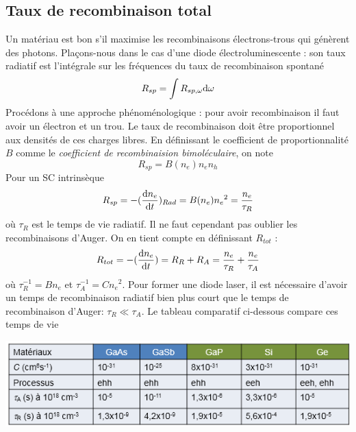 	\subsection{Taux de recombinaison total}
	Un matériau est bon s'il maximise les recombinaisons électrons-trous qui génèrent des photons. 
	Plaçons-nous dans le cas d'une diode électroluminescente : son taux radiatif est l'intégrale 
	sur les fréquences du taux de recombinaison spontané
	\begin{equation}
	{R_{sp}} = \int {{R_{sp,\omega }}{\rm{d}}\omega } 
	\end{equation}
	Procédons à une approche phénoménologique : pour avoir recombinaison il faut avoir un électron 
	et un trou. Le taux de recombinaison doit être proportionnel aux densités de ces charges libres. 
	En définissant le coefficient de proportionnalité $B$ comme le \textit{coefficient de 
	recombinaision bimoléculaire}, on note
	\begin{equation}
	{R_{sp}} = B({n_e}){n_e}{n_h}
	\end{equation}
	Pour un SC intrinsèque
	\begin{equation}
	{R_{sp}} =  - {(\frac{{{\rm{d}}{n_e}}}{{{\rm{d}}t}})_{Rad}} = B({n_e}){n_e}^2 = \frac{{{n_e}}}
	{{{\tau _R}}}
	\end{equation}
	où $\tau_R$ est le temps de vie radiatif. Il ne faut cependant pas oublier les recombinaisons 
	d'Auger. On en tient compte en définissant $R_{tot}$ :
	\begin{equation}
	{R_{tot}} =  - (\frac{{{\rm{d}}{n_e}}}{{{\rm{d}}t}}) = {R_R} + {R_A} = \frac{{{n_e}}}{{{\tau _R}}}
	 + \frac{{{n_e}}}{{{\tau _A}}}
	\end{equation}
	où $\tau _R^{ - 1} = B{n_e}$ et $\tau _A^{ - 1} = C{n_e}^2$. Pour former une diode laser, il est
	nécessaire d'avoir un temps de recombinaison radiatif bien plus court que le temps de 
	recombinaison d'Auger: $\tau_R \ll \tau_A$. Le tableau comparatif ci-dessous compare ces temps 
	de vie
	\begin{center}
	\includegraphics[scale=0.8]{ch5/image32}
	\end{center}

